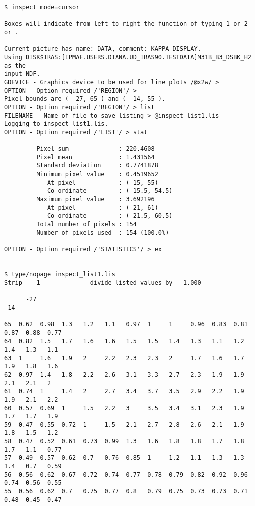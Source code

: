 \begin{small}
\begin{verbatim}
$ inspect mode=cursor

Boxes will indicate from left to right the function of typing 1 or 2 or .

Current picture has name: DATA, comment: KAPPA_DISPLAY.
Using DISK$IRAS:[IPMAF.USERS.DIANA.UD_IRAS90.TESTDATA]M31B_B3_DSBK_H2 as the
input NDF.
GDEVICE - Graphics device to be used for line plots /@x2w/ > 
OPTION - Option required /'REGION'/ > 
Pixel bounds are ( -27, 65 ) and ( -14, 55 ).
OPTION - Option required /'REGION'/ > list
FILENAME - Name of file to save listing > @inspect_list1.lis
Logging to inspect_list1.lis.
OPTION - Option required /'LIST'/ > stat

         Pixel sum              : 220.4608
         Pixel mean             : 1.431564
         Standard deviation     : 0.7741878
         Minimum pixel value    : 0.4519652
            At pixel            : (-15, 55)
            Co-ordinate         : (-15.5, 54.5)
         Maximum pixel value    : 3.692196
            At pixel            : (-21, 61)
            Co-ordinate         : (-21.5, 60.5)
         Total number of pixels : 154
         Number of pixels used  : 154 (100.0%)

OPTION - Option required /'STATISTICS'/ > ex


$ type/nopage inspect_list1.lis
Strip    1              divide listed values by   1.000  
                                                                             
      -27                                                                         -14            
                                                                 
65  0.62  0.98  1.3   1.2   1.1   0.97  1     1     0.96  0.83  0.81  0.87  0.88  0.77            
64  0.82  1.5   1.7   1.6   1.6   1.5   1.5   1.4   1.3   1.1   1.2   1.4   1.3   1.1             
63  1     1.6   1.9   2     2.2   2.3   2.3   2     1.7   1.6   1.7   1.9   1.8   1.6             
62  0.97  1.4   1.8   2.2   2.6   3.1   3.3   2.7   2.3   1.9   1.9   2.1   2.1   2               
61  0.74  1     1.4   2     2.7   3.4   3.7   3.5   2.9   2.2   1.9   1.9   2.1   2.2             
60  0.57  0.69  1     1.5   2.2   3     3.5   3.4   3.1   2.3   1.9   1.7   1.7   1.9             
59  0.47  0.55  0.72  1     1.5   2.1   2.7   2.8   2.6   2.1   1.9   1.8   1.5   1.2             
58  0.47  0.52  0.61  0.73  0.99  1.3   1.6   1.8   1.8   1.7   1.8   1.7   1.1   0.77            
57  0.49  0.57  0.62  0.7   0.76  0.85  1     1.2   1.1   1.3   1.3   1.4   0.7   0.59            
56  0.56  0.62  0.67  0.72  0.74  0.77  0.78  0.79  0.82  0.92  0.96  0.74  0.56  0.55            
55  0.56  0.62  0.7   0.75  0.77  0.8   0.79  0.75  0.73  0.73  0.71  0.48  0.45  0.47            
\end{verbatim}
\end{small}


